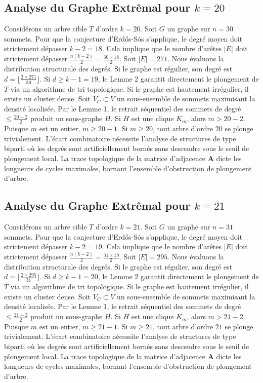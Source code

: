 \documentclass[11pt,a4paper]{article}
\begin{document}
\subsection{Analyse du Graphe Extr\^emal pour $k=20$}
Consid\'erons un arbre cible $T$ d'ordre $k=20$.
Soit $G$ un graphe sur $n=30$ sommets.
Pour que la conjecture d'Erd\H{o}s-S\'os s'applique, le degr\'e moyen doit strictement d\'epasser $k-2 = 18$.
Cela implique que le nombre d'ar\^etes $|E|$ doit strictement d\'epasser $\frac{n(k-2)}{2} = \frac{30 \times 18}{2}$.
Soit $|E| = 271$.
Nous \'evaluons la distribution structurale des degr\'es. Si le graphe est r\'egulier, son degr\'e est $d = \lfloor \frac{2 \times 271}{30} \rfloor$.
Si $d \geq k-1 = 19$, le Lemme 2 garantit directement le plongement de $T$ via un algorithme de tri topologique.
Si le graphe est hautement irr\'egulier, il existe un cluster dense. Soit $V_C \subset V$ un sous-ensemble de sommets maximisant la densit\'e localis\'ee.
Par le Lemme 1, le retrait s\'equentiel des sommets de degr\'e $\leq \frac{20-2}{2}$ produit un sous-graphe $H$.
Si $H$ est une clique $K_{m}$, alors $m > 20-2$. Puisque $m$ est un entier, $m \geq 20-1$. Si $m \geq 20$, tout arbre d'ordre $20$ se plonge trivialement.
L'\'ecart combinatoire n\'ecessite l'analyse de structures de type biparti o\`u les degr\'es sont artificiellement born\'es sans descendre sous le seuil de plongement local. La trace topologique de la matrice d'adjacence $\mathbf{A}$ dicte les longueurs de cycles maximales, bornant l'ensemble d'obstruction de plongement d'arbre.


\subsection{Analyse du Graphe Extr\^emal pour $k=21$}
Consid\'erons un arbre cible $T$ d'ordre $k=21$.
Soit $G$ un graphe sur $n=31$ sommets.
Pour que la conjecture d'Erd\H{o}s-S\'os s'applique, le degr\'e moyen doit strictement d\'epasser $k-2 = 19$.
Cela implique que le nombre d'ar\^etes $|E|$ doit strictement d\'epasser $\frac{n(k-2)}{2} = \frac{31 \times 19}{2}$.
Soit $|E| = 295$.
Nous \'evaluons la distribution structurale des degr\'es. Si le graphe est r\'egulier, son degr\'e est $d = \lfloor \frac{2 \times 295}{31} \rfloor$.
Si $d \geq k-1 = 20$, le Lemme 2 garantit directement le plongement de $T$ via un algorithme de tri topologique.
Si le graphe est hautement irr\'egulier, il existe un cluster dense. Soit $V_C \subset V$ un sous-ensemble de sommets maximisant la densit\'e localis\'ee.
Par le Lemme 1, le retrait s\'equentiel des sommets de degr\'e $\leq \frac{21-2}{2}$ produit un sous-graphe $H$.
Si $H$ est une clique $K_{m}$, alors $m > 21-2$. Puisque $m$ est un entier, $m \geq 21-1$. Si $m \geq 21$, tout arbre d'ordre $21$ se plonge trivialement.
L'\'ecart combinatoire n\'ecessite l'analyse de structures de type biparti o\`u les degr\'es sont artificiellement born\'es sans descendre sous le seuil de plongement local. La trace topologique de la matrice d'adjacence $\mathbf{A}$ dicte les longueurs de cycles maximales, bornant l'ensemble d'obstruction de plongement d'arbre.
\end{document}
